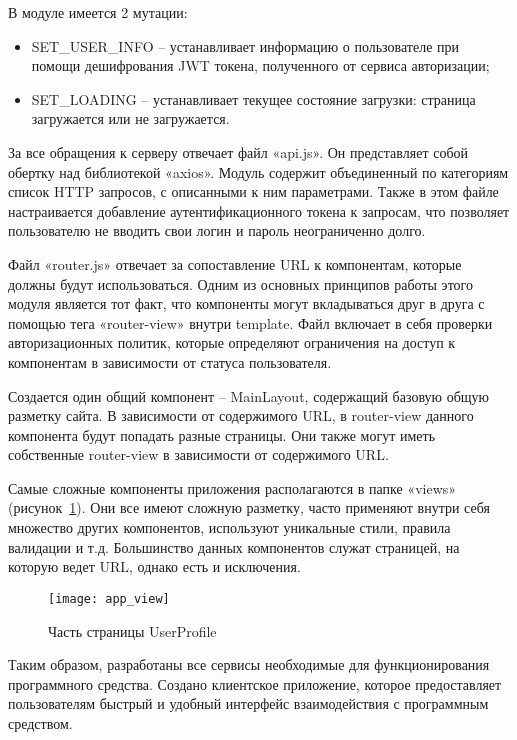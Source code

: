 В модуле имеется 2 мутации:

\begin{itemize}
    \item SET\_USER\_INFO – устанавливает информацию о пользователе при помощи дешифрования JWT токена, полученного от сервиса авторизации;
    \item SET\_LOADING – устанавливает текущее состояние загрузки: страница загружается или не загружается.
\end{itemize}

За все обращения к серверу отвечает файл «api.js». Он представляет собой обертку над библиотекой «axios». Модуль содержит объединенный по категориям список HTTP запросов, с описанными к ним параметрами. Также в этом файле настраивается добавление аутентификационного токена к запросам, что позволяет пользователю не вводить свои логин и пароль неограниченно долго. 

Файл «router.js» отвечает за сопоставление URL к компонентам, которые должны будут использоваться. Одним из основных принципов работы этого модуля является тот факт, что компоненты могут вкладываться друг в друга с помощью тега «router-view» внутри template. Файл включает в себя проверки авторизационных политик, которые определяют ограничения на доступ к компонентам в зависимости от статуса пользователя.

Создается один общий компонент – MainLayout, содержащий базовую общую разметку сайта. В зависимости от содержимого URL, в router-view данного компонента будут попадать разные страницы. Они также могут иметь собственные router-view в зависимости от содержимого URL.

Самые сложные компоненты приложения располагаются в папке «views» (рисунок~\ref{fig:app_view}). Они все имеют сложную разметку, часто применяют внутри себя множество других компонентов, используют уникальные стили, правила валидации и т.д. Большинство данных компонентов служат страницей, на которую ведет URL, однако есть и исключения.

\begin{figure}[h]
    \centering
    \texttt{[image: app\_view]}
    \caption{Часть страницы UserProfile}\label{fig:app_view}
\end{figure}

Таким образом, разработаны все сервисы необходимые для функционирования программного средства. Создано клиентское приложение, которое предоставляет пользователям быстрый и удобный интерфейс взаимодействия с программным средством.

